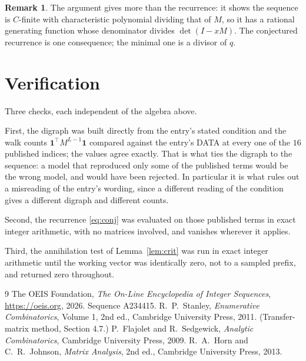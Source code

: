 \documentclass[11pt,a4paper]{article}
\theoremstyle{plain}
\theoremstyle{definition}
\newtheorem{remark}[theorem]{Remark}
\begin{document}
\begin{remark}
The argument gives more than the recurrence: it shows the sequence is $C$-finite with
characteristic polynomial dividing that of $M$, so it has a rational generating function
whose denominator divides $\det(I-xM)$. The conjectured recurrence is one consequence; the
minimal one is a divisor of $q$.
\end{remark}

\section{Verification}

Three checks, each independent of the algebra above.

First, the digraph was built directly from the entry's stated condition and the walk counts
$\mathbf{1}^{\!\top}M^{L-1}\mathbf{1}$ compared against the entry's DATA at
every one of the $16$ published indices; the values agree exactly. That is what ties
the digraph to the sequence: a model that reproduced only some of the published terms would
be the wrong model, and would have been rejected. In particular it is what rules out a
misreading of the entry's wording, since a different reading of the condition gives a
different digraph and different counts.

Second, the recurrence \eqref{eq:conj} was evaluated on those published terms in exact
integer arithmetic, with no matrices involved, and vanishes wherever it applies.

Third, the annihilation test of Lemma~\ref{lem:crit} was run in exact integer arithmetic
until the working vector was identically zero, not to a sampled prefix, and returned zero
throughout.

\begin{thebibliography}{9}
 The OEIS Foundation, \emph{The On-Line Encyclopedia of Integer
Sequences}, \url{https://oeis.org}, 2026. Sequence A234415.
 R.~P.~Stanley, \emph{Enumerative Combinatorics}, Volume 1, 2nd ed.,
Cambridge University Press, 2011. (Transfer-matrix method, Section 4.7.)
 P.~Flajolet and R.~Sedgewick, \emph{Analytic Combinatorics}, Cambridge
University Press, 2009.
 R.~A.~Horn and C.~R.~Johnson, \emph{Matrix Analysis}, 2nd ed., Cambridge
University Press, 2013.
\end{thebibliography}
\end{document}
